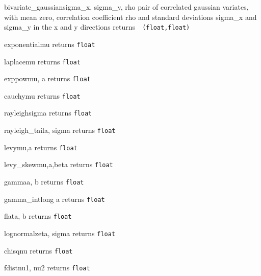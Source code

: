 \begin{methoddesc}{bivariate\_gaussian}{sigma\_x, sigma\_y, rho}
  pair of correlated gaussian variates, with mean zero, correlation coefficient rho and
  standard deviations sigma\_x and sigma\_y in the x and y directions \hfill returns~{\tt
    (float,float)}
\end{methoddesc}
\begin{methoddesc}{exponential}{mu}
  \hfill returns {\tt float}
\end{methoddesc}
\begin{methoddesc}{laplace}{mu}
  \hfill returns {\tt float}
\end{methoddesc}
\begin{methoddesc}{exppow}{mu, a}
  \hfill returns {\tt float}
\end{methoddesc}
\begin{methoddesc}{cauchy}{mu}
  \hfill returns {\tt float}
\end{methoddesc}
\begin{methoddesc}{rayleigh}{sigma}
  \hfill returns {\tt float}
\end{methoddesc}
\begin{methoddesc}{rayleigh\_tail}{a, sigma}
  \hfill returns {\tt float}
\end{methoddesc}
\begin{methoddesc}{levy}{mu,a}
  \hfill returns {\tt float}
\end{methoddesc}
\begin{methoddesc}{levy_skew}{mu,a,beta}
  \hfill returns {\tt float}
\end{methoddesc}
\begin{methoddesc}{gamma}{a, b}
  \hfill returns {\tt float}
\end{methoddesc}
\begin{methoddesc}{gamma\_int}{long a}
  \hfill returns {\tt float}
\end{methoddesc}
\begin{methoddesc}{flat}{a, b}
  \hfill returns {\tt float}
\end{methoddesc}
\begin{methoddesc}{lognormal}{zeta, sigma}
  \hfill returns {\tt float}
\end{methoddesc}
\begin{methoddesc}{chisq}{nu}
  \hfill returns {\tt float}
\end{methoddesc}
\begin{methoddesc}{fdist}{nu1, nu2}
  \hfill returns {\tt float}
\end{methoddesc}
